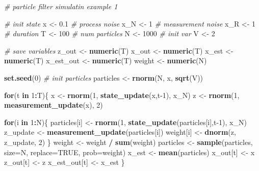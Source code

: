 \documentclass[
]{article}
\newenvironment{Shaded}{\begin{snugshade}}{\end{snugshade}}
\newcommand{\CommentTok}[1]{\textcolor[rgb]{0.56,0.35,0.01}{\textit{#1}}}
\newcommand{\ControlFlowTok}[1]{\textcolor[rgb]{0.13,0.29,0.53}{\textbf{#1}}}
\newcommand{\DataTypeTok}[1]{\textcolor[rgb]{0.13,0.29,0.53}{#1}}
\newcommand{\DecValTok}[1]{\textcolor[rgb]{0.00,0.00,0.81}{#1}}
\newcommand{\FloatTok}[1]{\textcolor[rgb]{0.00,0.00,0.81}{#1}}
\newcommand{\KeywordTok}[1]{\textcolor[rgb]{0.13,0.29,0.53}{\textbf{#1}}}
\newcommand{\NormalTok}[1]{#1}
\newcommand{\OperatorTok}[1]{\textcolor[rgb]{0.81,0.36,0.00}{\textbf{#1}}}
\newcommand{\OtherTok}[1]{\textcolor[rgb]{0.56,0.35,0.01}{#1}}
\newcommand{\StringTok}[1]{\textcolor[rgb]{0.31,0.60,0.02}{#1}}
\begin{document}
\begin{Shaded}
\begin{Highlighting}[]
\CommentTok{# particle filter simulatin example 1}

\CommentTok{# init state}
\NormalTok{x <-}\StringTok{ }\FloatTok{0.1}
\CommentTok{# process noise}
\NormalTok{x_N <-}\StringTok{ }\DecValTok{1} 
\CommentTok{# measurement noise}
\NormalTok{x_R <-}\StringTok{ }\DecValTok{1}
\CommentTok{# duration}
\NormalTok{T <-}\StringTok{ }\DecValTok{100}
\CommentTok{# num particles}
\NormalTok{N <-}\StringTok{ }\DecValTok{1000}
\CommentTok{# init var}
\NormalTok{V <-}\StringTok{ }\DecValTok{2}

\CommentTok{# save variables}
\NormalTok{z_out <-}\StringTok{ }\KeywordTok{numeric}\NormalTok{(T)}
\NormalTok{x_out <-}\StringTok{ }\KeywordTok{numeric}\NormalTok{(T)}
\NormalTok{x_est <-}\StringTok{ }\KeywordTok{numeric}\NormalTok{(T)}
\NormalTok{x_est_out <-}\StringTok{ }\KeywordTok{numeric}\NormalTok{(T)}
\NormalTok{weight <-}\StringTok{ }\KeywordTok{numeric}\NormalTok{(N)}


\KeywordTok{set.seed}\NormalTok{(}\DecValTok{0}\NormalTok{)}
\CommentTok{# init particles}
\NormalTok{particles <-}\StringTok{ }\KeywordTok{rnorm}\NormalTok{(N, x, }\KeywordTok{sqrt}\NormalTok{(V))}

\ControlFlowTok{for}\NormalTok{(t }\ControlFlowTok{in} \DecValTok{1}\OperatorTok{:}\NormalTok{T)\{}
\NormalTok{    x  <-}\StringTok{ }\KeywordTok{rnorm}\NormalTok{(}\DecValTok{1}\NormalTok{, }\KeywordTok{state_update}\NormalTok{(x,t}\DecValTok{-1}\NormalTok{), x_N)}
\NormalTok{    z <-}\StringTok{ }\KeywordTok{rnorm}\NormalTok{(}\DecValTok{1}\NormalTok{, }\KeywordTok{measurement_update}\NormalTok{(x), }\DecValTok{2}\NormalTok{)}

    \ControlFlowTok{for}\NormalTok{(i }\ControlFlowTok{in} \DecValTok{1}\OperatorTok{:}\NormalTok{N)\{}
\NormalTok{        particles[i] <-}\StringTok{ }\KeywordTok{rnorm}\NormalTok{(}\DecValTok{1}\NormalTok{, }\KeywordTok{state_update}\NormalTok{(particles[i],t}\DecValTok{-1}\NormalTok{), x_N)}
\NormalTok{        z_update <-}\StringTok{ }\KeywordTok{measurement_update}\NormalTok{(particles[i])}
\NormalTok{        weight[i] <-}\StringTok{ }\KeywordTok{dnorm}\NormalTok{(z, z_update, }\DecValTok{2}\NormalTok{)}
\NormalTok{    \}}
\NormalTok{    weight  <-}\StringTok{ }\NormalTok{weight }\OperatorTok{/}\StringTok{ }\KeywordTok{sum}\NormalTok{(weight)}
\NormalTok{    particles <-}\StringTok{ }\KeywordTok{sample}\NormalTok{(particles, }\DataTypeTok{size=}\NormalTok{N, }\DataTypeTok{replace=}\OtherTok{TRUE}\NormalTok{, }\DataTypeTok{prob=}\NormalTok{weight)}
\NormalTok{    x_est <-}\StringTok{ }\KeywordTok{mean}\NormalTok{(particles)}
\NormalTok{    x_out[t] <-}\StringTok{ }\NormalTok{x}
\NormalTok{    z_out[t] <-}\StringTok{ }\NormalTok{z}
\NormalTok{    x_est_out[t] <-}\StringTok{ }\NormalTok{x_est}
\NormalTok{\}}


\end{Highlighting}
\end{Shaded}
\end{document}
